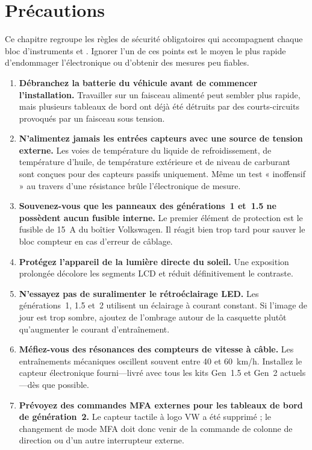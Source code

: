 \chapter{Précautions}\label{ch:precautions}

Ce chapitre regroupe les règles de sécurité obligatoires qui accompagnent chaque bloc d'instruments \ReplicaGenOne{} et \ReplicaNextLong{}.
Ignorer l'un de ces points est le moyen le plus rapide d'endommager l'électronique ou d'obtenir des mesures peu fiables.

\begin{enumerate}
    \item \textbf{Débranchez la batterie du véhicule avant de commencer l'installation.} Travailler sur un faisceau alimenté peut sembler plus rapide, mais plusieurs tableaux de bord ont déjà été détruits par des courts-circuits provoqués par un faisceau sous tension.
    \item \textbf{N'alimentez jamais les entrées capteurs avec une source de tension externe.} Les voies de température du liquide de refroidissement, de température d'huile, de température extérieure et de niveau de carburant sont conçues pour des capteurs passifs uniquement. Même un test « inoffensif » au travers d'une résistance brûle l'électronique de mesure.
    \item \textbf{Souvenez-vous que les panneaux des générations~1 et~1.5 ne possèdent aucun fusible interne.} Le premier élément de protection est le fusible de 15~A du boîtier Volkswagen. Il réagit bien trop tard pour sauver le bloc compteur en cas d'erreur de câblage.
    \item \textbf{Protégez l'appareil de la lumière directe du soleil.} Une exposition prolongée décolore les segments LCD et réduit définitivement le contraste.
    \item \textbf{N'essayez pas de suralimenter le rétroéclairage LED.} Les générations~1, 1.5 et~2 utilisent un éclairage à courant constant. Si l'image de jour est trop sombre, ajoutez de l'ombrage autour de la casquette plutôt qu'augmenter le courant d'entraînement.
    \item \textbf{Méfiez-vous des résonances des compteurs de vitesse à câble.} Les entraînements mécaniques oscillent souvent entre 40 et 60~km/h. Installez le capteur électronique fourni---livré avec tous les kits Gen~1.5 et Gen~2 actuels---dès que possible.
    \item \textbf{Prévoyez des commandes MFA externes pour les tableaux de bord de génération~2.} Le capteur tactile à logo VW a été supprimé ; le changement de mode MFA doit donc venir de la commande de colonne de direction ou d'un autre interrupteur externe.

\end{enumerate}
